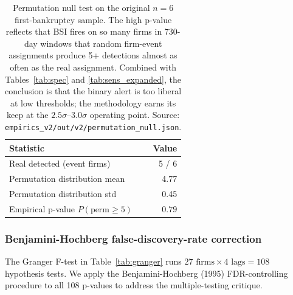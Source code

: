 \documentclass[11pt,a4paper]{article}
\begin{document}
\begin{table}[h]
\centering\small
\begin{tabular}{@{}lr@{}}
\toprule
\textbf{Statistic} & \textbf{Value} \\
\midrule
Real detected (event firms)   & 5 / 6      \\
Permutation distribution mean & 4.77       \\
Permutation distribution std  & 0.45       \\
Empirical p-value $P(\text{perm} \ge 5)$ & $0.79$ \\
\bottomrule
\end{tabular}
\caption{Permutation null test on the original $n=6$ first-bankruptcy sample. The high p-value reflects that BSI fires on so many firms in 730-day windows that random firm-event assignments produce 5+ detections almost as often as the real assignment. Combined with Tables~\ref{tab:spec} and \ref{tab:sens_expanded}, the conclusion is that the binary alert is too liberal at low thresholds; the methodology earns its keep at the $2.5\sigma$--$3.0\sigma$ operating point. Source: \texttt{empirics\_v2/out/v2/permutation\_null.json}.}\label{tab:perm}
\end{table}

\subsubsection{Benjamini-Hochberg false-discovery-rate correction}

The Granger F-test in Table~\ref{tab:granger} runs $27 \text{ firms} \times 4 \text{ lags} = 108$ hypothesis tests. We apply the Benjamini-Hochberg (1995) FDR-controlling procedure to all 108 p-values to address the multiple-testing critique.

\begin{table}[h]
\centering\small
{}
\caption{Granger causality F-tests after BH-FDR correction. The 1-month-lag result --- the strongest single finding in the paper --- is fully robust to multiple-testing correction: 23 of 27 firms still reject the null at $p<0.05$ after BH-FDR adjustment. Only one borderline observation at the 3-month lag drops below significance. Source: \texttt{empirics\_v2/out/v2/granger\_bh\_fdr.csv}.}\label{tab:fdr}
\end{table}
\end{document}
